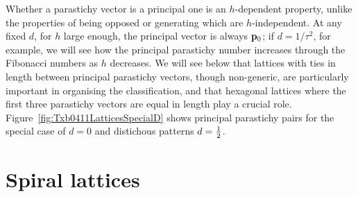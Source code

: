 Whether a parastichy vector is a principal one is an $h$-dependent property, unlike the properties of being opposed or generating which are $h$-independent. At any fixed $d$, for $h$ large enough, the principal vector is always ${\mathbf p}_{0}$; if $d=1/\tau^2$, for example, we will see  how the principal parastichy number increases through the Fibonacci numbers as $h$ decreases. We will see below that lattices with ties in length between principal parastichy vectors, though non-generic, are particularly important in organising the classification, and that hexagonal lattices where the first three parastichy vectors are equal in length play a crucial role. 
Figure~\ref{fig:Txb0411LatticesSpecialD} shows principal parastichy pairs for the special case of  $d=0$ and distichous patterns $d=\textstyle{\frac{1}{2}}$.  
%
\section{Spiral lattices}
\label{sec:spiral}

